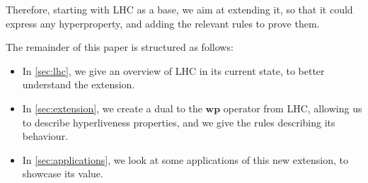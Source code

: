 Therefore, starting with LHC as a base, we aim at extending it, so that it could express any hyperproperty, and adding the relevant rules to prove them.

The remainder of this paper is structured as follows:

\begin{itemize}
    \item In \cref{sec:lhc}, we give an overview of LHC in its current state, to better understand the extension.
    \item In \cref{sec:extension}, we create a dual to the $\mathbf{wp}$ operator from LHC, allowing us to describe hyperliveness properties, and we give the rules describing its behaviour.
    \item In \cref{sec:applications}, we look at some applications of this new extension, to showcase its value.
\end{itemize}